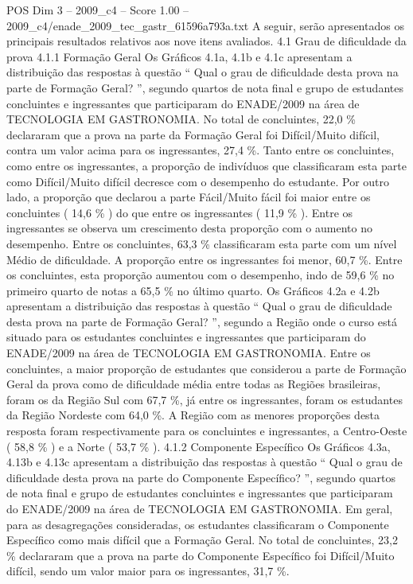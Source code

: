 \begin{textsample}{POS Dim 3 – 2009\_c4 – Score 1.00 – 2009\_c4/enade\_2009\_tec\_gastr\_61596a793a.txt}
A seguir, serão apresentados os principais resultados relativos aos nove itens avaliados. 4.1 Grau de dificuldade da prova 4.1.1 Formação Geral Os Gráficos 4.1a, 4.1b e 4.1c apresentam a distribuição das respostas à questão “ Qual o grau de dificuldade desta prova na parte de Formação Geral? ”, segundo quartos de nota final e grupo de estudantes concluintes e ingressantes que participaram do ENADE/2009 na área de TECNOLOGIA EM GASTRONOMIA.
No total de concluintes, 22,0 \% declararam que a prova na parte da Formação Geral foi Difícil/Muito difícil, contra um valor acima para os ingressantes, 27,4 \%.
Tanto entre os concluintes, como entre os ingressantes, a proporção de indivíduos que classificaram esta parte como Difícil/Muito difícil decresce com o desempenho do estudante.
Por outro lado, a proporção que declarou a parte Fácil/Muito fácil foi maior entre os concluintes ( 14,6 \% ) do que entre os ingressantes ( 11,9 \% ).
Entre os ingressantes se observa um crescimento desta proporção com o aumento no desempenho.
Entre os concluintes, 63,3 \% classificaram esta parte com um nível Médio de dificuldade.
A proporção entre os ingressantes foi menor, 60,7 \%.
Entre os concluintes, esta proporção aumentou com o desempenho, indo de 59,6 \% no primeiro quarto de notas a 65,5 \% no último quarto.
Os Gráficos 4.2a e 4.2b apresentam a distribuição das respostas à questão “ Qual o grau de dificuldade desta prova na parte de Formação Geral? ”, segundo a Região onde o curso está situado para os estudantes concluintes e ingressantes que participaram do ENADE/2009 na área de TECNOLOGIA EM GASTRONOMIA.
Entre os concluintes, a maior proporção de estudantes que considerou a parte de Formação Geral da prova como de dificuldade média entre todas as Regiões brasileiras, foram os da Região Sul com 67,7 \%, já entre os ingressantes, foram os estudantes da Região Nordeste com 64,0 \%.
A Região com as menores proporções desta resposta foram respectivamente para os concluintes e ingressantes, a Centro-Oeste ( 58,8 \% ) e a Norte ( 53,7 \% ). 4.1.2 Componente Específico Os Gráficos 4.3a, 4.13b e 4.13c apresentam a distribuição das respostas à questão “ Qual o grau de dificuldade desta prova na parte do Componente Específico? ”, segundo quartos de nota final e grupo de estudantes concluintes e ingressantes que participaram do ENADE/2009 na área de TECNOLOGIA EM GASTRONOMIA.
Em geral, para as desagregações consideradas, os estudantes classificaram o Componente Específico como mais difícil que a Formação Geral.
No total de concluintes, 23,2 \% declararam que a prova na parte do Componente Específico foi Difícil/Muito difícil, sendo um valor maior para os ingressantes, 31,7 \%.

\end{textsample}
